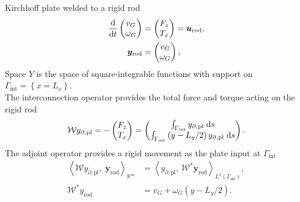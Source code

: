 \documentclass[aspectratio=169]{ISAE-Beamer}
\begin{document}
\begin{frame}{Kirchhoff plate welded to a rigid rod}
\begin{equation*}
\begin{aligned}
\displaystyle \diff{}{t}
\begin{pmatrix}
v_G \\ \omega_G \\
\end{pmatrix} & = \begin{pmatrix}
F_z \\ T_x \\
\end{pmatrix} = \bm{u}_{\text{rod}}\vspace{1mm}, \\
\bm{y}_{\text{rod}} &= \begin{pmatrix}
v_G \\ \omega_{G} \\
\end{pmatrix},
\end{aligned}
\end{equation*}
Space $Y$ is the space of square-integrable functions with support on $\Gamma_{\text{int}} = \left\{x=L_x\right\}$. \\
The interconnection operator  provides the total force and torque acting on the rigid rod
\begin{equation*}
\mathcal{W} y_{\partial, \text{pl}} =  - \begin{pmatrix}
F_z \\
T_x \\
\end{pmatrix} = \begin{pmatrix}
\int_{\Gamma_{\text{int}}} y_{\partial, \text{pl}} \d{s} \\
\int_{\Gamma_{\text{int}}} \left( y - L_y/2 \right) y_{\partial, \text{pl}} \d{s} \\
\end{pmatrix}.
\end{equation*}
The adjoint operator provides a rigid movement as the plate input at $\Gamma_{\text{int}}$
\begin{align*}
\left\langle \mathcal{W} y_{\partial, \text{pl}}, \; \bm{y}_{\text{rod}} \right\rangle_{\mathbb{R}^m} &= \left\langle y_{\partial, \text{pl}}, \, \mathcal{W}^* \bm{y}_{\text{rod}}\right\rangle_{L^2(\Gamma_{\text{int}})}, \\
\mathcal{W}^* {y}_{\text{rod}} &= v_G + \omega_{G} \left( y - L_y/2 \right).
\end{align*}
\end{frame}
\end{document}
